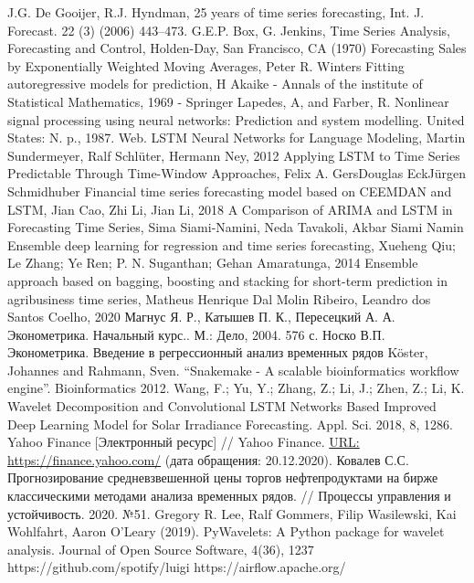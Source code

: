 \documentclass[a4paper,article,14pt]{extarticle}
\begin{document}
\begin{thebibliography}{1}
 J.G. De Gooijer, R.J. Hyndman, 25 years of time series forecasting, Int. J. Forecast. 22 (3) (2006) 443–473.
 G.E.P. Box, G. Jenkins, Time Series Analysis, Forecasting and Control, Holden-Day, San Francisco, CA (1970)
 Forecasting Sales by Exponentially Weighted Moving Averages, Peter R. Winters
 Fitting autoregressive models for prediction, H Akaike - Annals of the institute of Statistical Mathematics, 1969 - Springer
 Lapedes, A, and Farber, R. Nonlinear signal processing using neural networks: Prediction and system modelling. United States: N. p., 1987. Web.
 LSTM Neural Networks for Language Modeling, Martin Sundermeyer, Ralf Schlüter, Hermann Ney, 2012
 Applying LSTM to Time Series Predictable Through Time-Window Approaches, Felix A. GersDouglas EckJürgen Schmidhuber
 Financial time series forecasting model based on CEEMDAN and LSTM, Jian Cao, Zhi Li, Jian Li, 2018
 A Comparison of ARIMA and LSTM in Forecasting Time Series, Sima Siami-Namini, Neda Tavakoli, Akbar Siami Namin
 Ensemble deep learning for regression and time series forecasting, Xueheng Qiu; Le Zhang; Ye Ren; P. N. Suganthan; Gehan Amaratunga, 2014
 Ensemble approach based on bagging, boosting and stacking for short-term prediction in agribusiness time series, Matheus Henrique Dal Molin Ribeiro, Leandro dos Santos Coelho, 2020
 Магнус Я. Р., Катышев П. К., Пересецкий А. А. Эконометрика. Начальный курс.. М.: Дело, 2004. 576 с.
 Носко В.П. Эконометрика. Введение в регрессионный анализ временных рядов
 Köster, Johannes and Rahmann, Sven. “Snakemake - A scalable bioinformatics workflow engine”. Bioinformatics 2012.
 Wang, F.; Yu, Y.; Zhang, Z.; Li, J.; Zhen, Z.; Li, K. Wavelet Decomposition and Convolutional LSTM Networks Based Improved Deep Learning Model for Solar Irradiance Forecasting. Appl. Sci. 2018, 8, 1286.
 Yahoo Finance [Электронный ресурс] // Yahoo Finance. \url{URL:  https://finance.yahoo.com/} (дата обращения: 20.12.2020).
 Ковалев С.С. Прогнозирование средневзвешенной цены торгов нефтепродуктами на бирже классическими методами анализа временных рядов. // Процессы управления и устойчивость. 2020. №51.
 Gregory R. Lee, Ralf Gommers, Filip Wasilewski, Kai Wohlfahrt, Aaron O’Leary (2019). PyWavelets: A Python package for wavelet analysis. Journal of Open Source Software, 4(36), 1237
 https://github.com/spotify/luigi
 https://airflow.apache.org/
\end{thebibliography}
\end{document}
